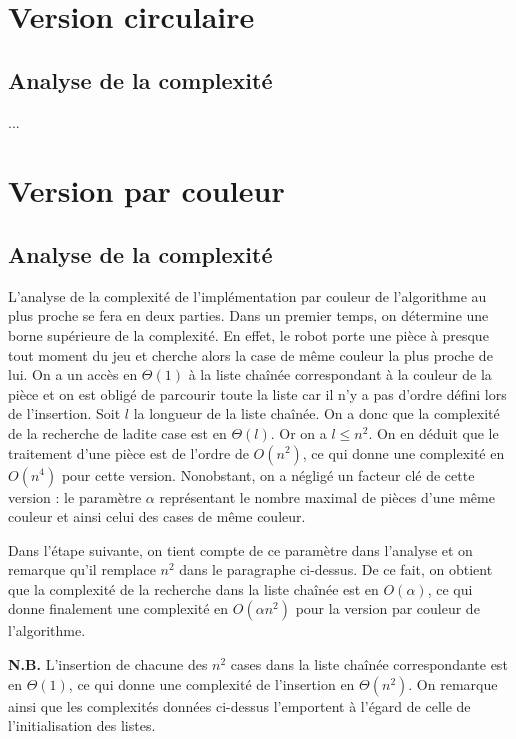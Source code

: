 \documentclass[12pt,a4paper]{article}
\begin{document}
\section{Version circulaire}
\subsection*{Analyse de la complexit\'e}
...

\section{Version par couleur}
\subsection*{Analyse de la complexit\'e}
L'analyse de la complexit\'e de l'impl\'ementation par couleur de 
l'algorithme au plus proche se fera en deux parties. Dans un premier temps, 
on d\'etermine une borne sup\'erieure de la complexit\'e. En effet, le 
robot porte une pi\`ece \`a presque tout moment du jeu et cherche alors la 
case de m\^eme couleur la plus proche de lui. On a un acc\`es en $\Theta(1)$ \`a 
la liste cha\^in\'ee correspondant \`a la couleur de la pi\`ece et on est 
oblig\'e de parcourir toute la liste car il n'y a pas d'ordre d\'efini 
lors de l'insertion. Soit $l$ la longueur de la liste cha\^in\'ee. On a donc que 
la complexit\'e de la recherche de ladite case est en $\Theta(l)$. Or on a $l 
\leq n^2$. On en d\'eduit que le traitement d'une pi\`ece est de l'ordre de 
$O(n^2)$, ce qui donne une complexit\'e en $O(n^4)$ pour cette version. 
Nonobstant, on a n\'eglig\'e un facteur cl\'e de cette version : le param\`etre 
$\alpha$ repr\'esentant le nombre maximal de pi\`eces d'une m\^eme couleur et 
ainsi celui des cases de m\^eme couleur. \par
Dans l'\'etape suivante, on tient compte de ce param\`etre dans l'analyse 
et on remarque qu'il remplace $n^2$ dans le paragraphe ci-dessus. De ce fait, 
on obtient que la complexit\'e de la recherche dans la liste cha\^in\'ee est en 
$O(\alpha)$, ce qui donne finalement une complexit\'e en $O(\alpha n^2)$ pour la 
version par couleur de l'algorithme.

{\bfseries N.B.} L'insertion de chacune des $n^2$ cases dans la liste 
cha\^in\'ee correspondante est en $\Theta(1)$, ce qui donne une complexit\'e de 
l'insertion en $\Theta(n^2)$. On remarque ainsi que les complexit\'es donn\'ees 
ci-dessus l'emportent \`a l'\'egard de celle de l'initialisation des listes.

\end{document}
